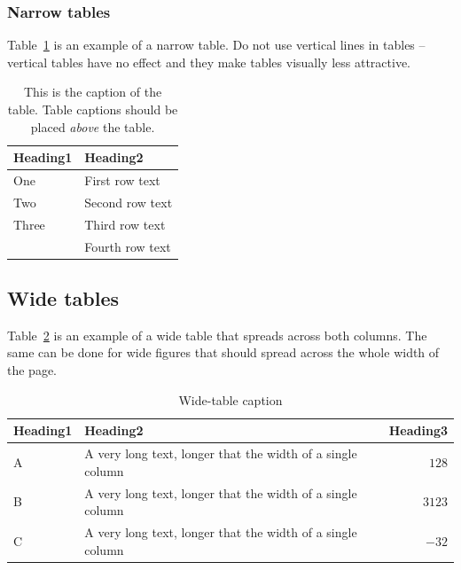 \documentclass[10pt, a4paper]{article}
\begin{document}
\subsubsection{Narrow tables}

Table~\ref{tab:narrow-table} is an example of a narrow table. Do not use vertical lines in tables -- vertical tables have no effect and they make tables visually less attractive.

\begin{table}
\caption{This is the caption of the table. Table captions should be placed \textit{above} the table.}
\label{tab:narrow-table}
\begin{center}
\begin{tabular}{ll}
\toprule
Heading1 & Heading2 \\
\midrule
One & First row text \\
Two   & Second row text \\
Three   & Third row text \\
      & Fourth row text \\
\bottomrule
\end{tabular}
\end{center}
\end{table}

\subsection{Wide tables}

Table~\ref{tab:wide-table} is an example of a wide table that spreads across both columns. The same can be done for wide figures that should spread across the whole width of the page. 

\begin{table}
\caption{Wide-table caption}
\label{tab:wide-table}
\begin{center}
\begin{tabular}{llr}
\toprule
Heading1 & Heading2 & Heading3\\
\midrule
A & A very long text, longer that the width of a single column & $128$\\
B & A very long text, longer that the width of a single column & $3123$\\
C & A very long text, longer that the width of a single column & $-32$\\
\bottomrule
\end{tabular}
\end{center}
\end{table}
\end{document}
